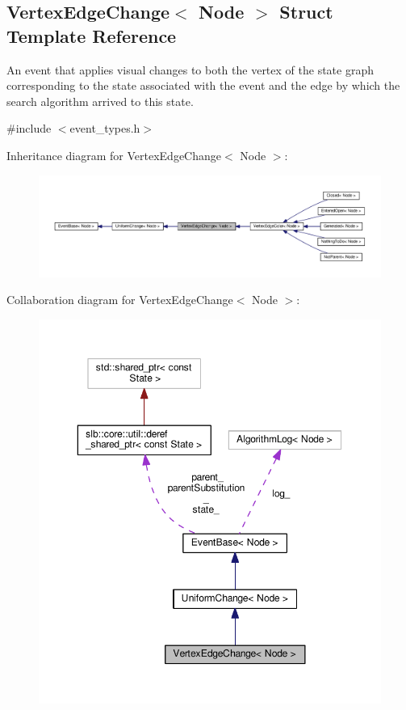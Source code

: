\hypertarget{structVertexEdgeChange}{}\subsection{Vertex\+Edge\+Change$<$ Node $>$ Struct Template Reference}
\label{structVertexEdgeChange}


An event that applies visual changes to both the vertex of the state graph corresponding to the state associated with the event and the edge by which the search algorithm arrived to this state.  




{\ttfamily \#include $<$event\+\_\+types.\+h$>$}



Inheritance diagram for Vertex\+Edge\+Change$<$ Node $>$\+:\nopagebreak
\begin{figure}[H]
\begin{center}
\leavevmode
\includegraphics[width=350pt]{structVertexEdgeChange__inherit__graph}
\end{center}
\end{figure}


Collaboration diagram for Vertex\+Edge\+Change$<$ Node $>$\+:\nopagebreak
\begin{figure}[H]
\begin{center}
\leavevmode
\includegraphics[width=350pt]{structVertexEdgeChange__coll__graph}
\end{center}
\end{figure}

